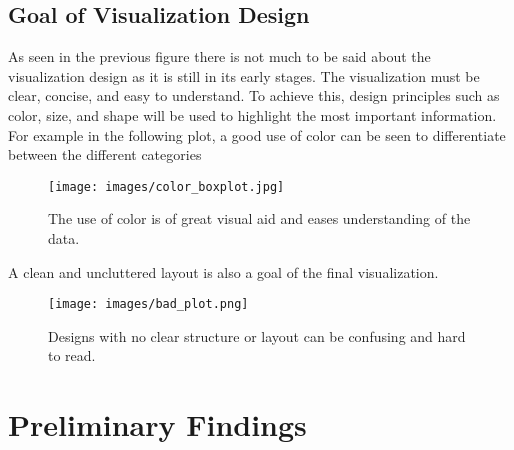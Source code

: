 \documentclass[12pt, a4paper]{article}
\begin{document}
\newpage

\subsection{Goal of Visualization Design}

\par As seen in the previous figure there is not much to be said about the visualization design as it is still in its early stages.
The visualization must be clear, concise, and easy to understand. To achieve this, design principles such as color, size, and shape will be used to highlight the most important information.
For example in the following plot, a good use of color can be seen to differentiate between the different categories
\begin{figure}[!h]
    \centering
    \texttt{[image: images/color\_boxplot.jpg]}
    \caption{The use of color is of great visual aid and eases understanding of the data.}
\end{figure}
\newpage
\par A clean and uncluttered layout is also a goal of the final visualization.

\begin{figure}[!h]
    \centering
    \texttt{[image: images/bad\_plot.png]}
    \caption{Designs with no clear structure or layout can be confusing and hard to read.}
\end{figure}

\section{Preliminary Findings}
\end{document}
